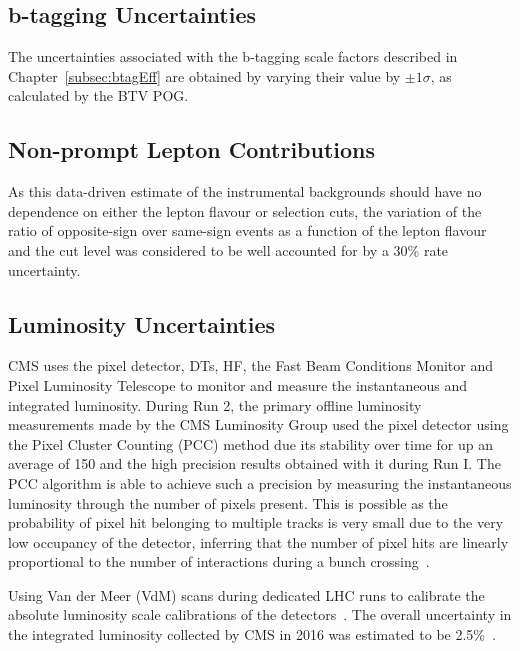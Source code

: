 \subsection{b-tagging Uncertainties}
The uncertainties associated with the b-tagging scale factors described in Chapter~\ref{subsec:btagEff} are obtained by varying their value by $\pm 1\sigma$, as calculated by the BTV POG.

\subsection{Non-prompt Lepton Contributions}
As this data-driven estimate of the instrumental backgrounds should have no dependence on either the lepton flavour or selection cuts, the variation of the ratio of opposite-sign over same-sign events as a function of the lepton flavour and the cut level was considered to be well accounted for by a 30\% rate uncertainty.

\subsection{Luminosity Uncertainties}
CMS uses the pixel detector, DTs, HF, the Fast Beam Conditions Monitor and Pixel Luminosity Telescope to monitor and measure the instantaneous and integrated luminosity.
During Run 2, the primary offline luminosity measurements made by the CMS Luminosity Group used the pixel detector using the Pixel Cluster Counting (PCC) method due its stability over time for up an average \PU of 150 and the high precision results obtained with it during Run I.
The PCC algorithm is able to achieve such a precision by measuring the instantaneous luminosity through the number of pixels present. 
This is possible as the probability of pixel hit belonging to multiple tracks is very small due to the very low occupancy of the detector, inferring that the number of pixel hits are linearly proportional to the number of interactions during a bunch crossing~\cite{CMS:2017_lumi}.

Using Van der Meer (VdM) scans during dedicated LHC runs to calibrate the absolute luminosity scale calibrations of the detectors~\cite{vanderMeer:1968zz}.
The overall uncertainty in the integrated luminosity collected by CMS in 2016 was estimated to be 2.5\%~\cite{CMS:2017_lumi}.


